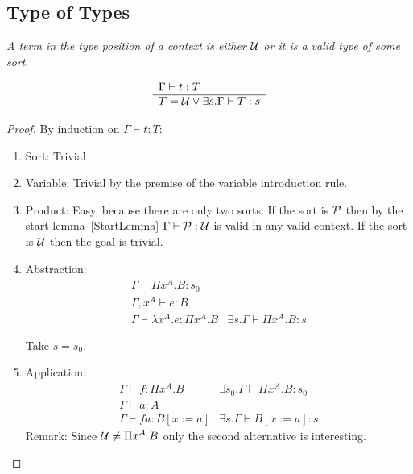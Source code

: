 \subsection{Type of Types}

\begin{theorem}
    \label{TypeOfTypes}
    \emph{A term in the type position of a context is either ${\cal U}$ or it is a
    valid type of some sort}.

    $$
    \begin{array}{l} 
        \Gamma \vdash t : T
     \\ \hline 
        T = {\cal U} \lor \exists s. \Gamma \vdash T : s
    \end{array}
    $$

    \begin{proof}
        By induction on $\Gamma \vdash t : T$:
        \begin{enumerate}
        \item Sort: Trivial

        \item Variable: Trivial by the premise of the variable introduction
            rule.

        \item Product: Easy, because there are only two sorts. If the sort is
            ${\cal P}$ then by the start lemma~\ref{StartLemma} $\Gamma\vdash
                {\cal P}: {\cal U}$ is valid in any valid context. If the sort is
                ${\cal U}$ then the goal is trivial.

        \item Abstraction:
            $$
            \begin{array}{l|l}
                \Gamma \vdash \Pi x^A. B : s_0
                \\
                \Gamma,x^A \vdash e: B
                \\
                \hline
                \Gamma \vdash \lambda x^A. e: \Pi x^A. B
                &
                \exists s. \Gamma \vdash \Pi x^A. B : s
            \end{array}
            $$

            Take $s = s_0$.

        \item Application:
            $$
            \begin{array}{l|l}
                \Gamma \vdash f: \Pi x^A. B
                & \exists s_0. \Gamma \vdash \Pi x^A. B: s_0
                \\
                \Gamma \vdash a: A
                \\
                \hline
                \Gamma \vdash f a: B[x:=a]
                &
                \exists s. \Gamma \vdash B[x:=a]: s
            \end{array}
            $$
            Remark: Since ${\cal U} \ne \Pi x^A. B$ only the second alternative is
                interesting.


\end{enumerate}
\end{proof}
\end{theorem}
